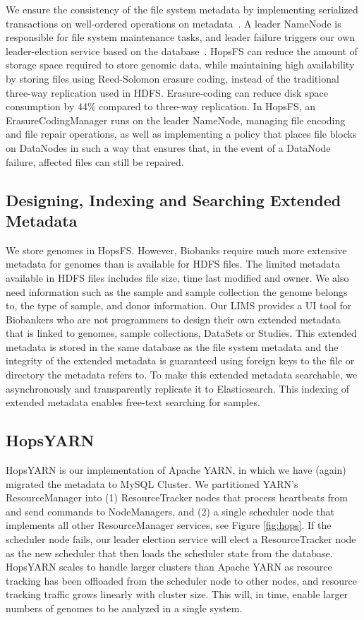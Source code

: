 We ensure the consistency of the file system metadata by implementing serialized transactions on well-ordered operations on metadata~\cite{hops_consistency}. A leader NameNode is responsible for file system maintenance tasks,  and leader failure triggers our own leader-election service based on the database~\cite{hopselection}. 
HopsFS can reduce the amount of storage space required to store genomic data, while maintaining high availability by storing files using Reed-Solomon erasure coding, instead of the traditional three-way replication  used in HDFS. Erasure-coding can reduce disk space consumption by 44\% compared to three-way replication. In HopsFS, an ErasureCodingManager runs on the  leader NameNode, managing file encoding and file repair operations, as well as implementing a policy that places file blocks on DataNodes in such a way that ensures that, in the event of a DataNode failure, affected files can still be repaired.

\subsection*{Designing, Indexing and Searching Extended Metadata}
We store genomes in HopsFS. However, Biobanks require much more extensive metadata for genomes than is available for HDFS files. The limited metadata available in HDFS files includes file size, time last modified and owner. We also need information such as the sample and sample collection the genome belongs to, the type of sample, and donor information. Our LIMS provides a UI tool for Biobankers who are not programmers to design their own  extended metadata that is linked  to genomes, sample collections, DataSets or Studies. This extended metadata is stored in the same database as the file system metadata and the integrity of the extended metadata is guaranteed using foreign keys to the file or directory the metadata refers to.
To make this extended metadata searchable, we asynchronously and transparently replicate it to Elasticsearch. This indexing of extended metadata enables free-text searching for samples.


\subsection*{HopsYARN}
HopsYARN is our implementation of Apache YARN, in which we have (again) migrated the metadata to MySQL Cluster. We partitioned YARN's ResourceManager into (1) ResourceTracker nodes that process heartbeats from and send commands to NodeManagers, and (2) a single scheduler node that implements all other ResourceManager services, see Figure \ref{fig:hops}. If the scheduler node fails, our leader election service will elect a ResourceTracker node as the new scheduler that then loads the scheduler state from the database. HopsYARN scales to handle larger clusters than Apache YARN as resource tracking has been offloaded from the scheduler node to other nodes, and resource tracking traffic grows linearly with cluster size. This will, in time, enable larger numbers of genomes to be analyzed in a single system.

